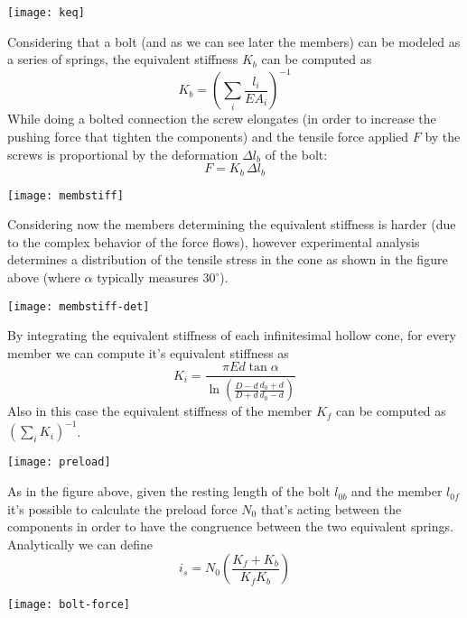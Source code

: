 \begin{multicols}{2}
	\begin{center}
		\texttt{[image: keq]}
	\end{center} 
	
	Considering that a bolt (and as we can see later the members) can be modeled as a series of springs, the equivalent stiffness $K_b$ can be computed as
	\begin{equation}
		K_b = \left( \sum_i \frac{l_i}{E A_i} \right)^{-1}
	\end{equation}
 	While doing a bolted connection the screw elongates (in order to increase the pushing force that tighten the components) and the tensile force applied $F$ by the screws is proportional by the deformation $\Delta l_b$ of the bolt:
 	\[ F =K_b \, \Delta l_b \]
 	
 	\begin{center}
 		\texttt{[image: membstiff]}
 	\end{center}  
 	
	Considering now the members determining the equivalent stiffness is harder (due to the complex behavior of the force flows), however experimental analysis determines a distribution of the tensile stress in the cone as shown in the figure above (where $\alpha$ typically measures $30^\circ$).
	\begin{center}
		\texttt{[image: membstiff-det]}
	\end{center}  
	By integrating the equivalent stiffness of each infinitesimal hollow cone, for every member we can compute it's equivalent stiffness as
	\begin{equation}
		K_i = \frac{\pi E d \tan \alpha}{\ln \left( \frac{D-d}{D+d} \frac{d_0+d}{d_0-d} \right)}
	\end{equation}
	Also in this case the equivalent stiffness of the member $K_f$ can be computed as $\left( \sum_i K_i \right)^{-1}$. 
	
	\begin{center}
		\texttt{[image: preload]}
	\end{center}
	As in the figure above, given the resting length of the bolt $l_{0b}$ and the member $l_{0f}$ it's possible to calculate the preload force $N_0$ that's acting between the components in order to have the congruence between the two equivalent springs.
	Analytically we can define
	\[ i_s = N_0 \left( \frac{K_f + K_b}{K_fK_b} \right) \]
	
	\begin{center}
		\texttt{[image: bolt-force]}
	\end{center}


\end{multicols}
